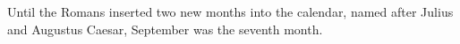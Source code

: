 Until the Romans inserted two new months into the calendar, named after
	Julius and Augustus Caesar, September was the seventh month.